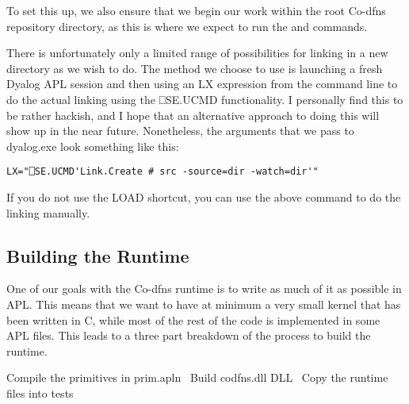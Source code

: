 \documentclass{article}%
\begin{document}
To set this up, we also ensure that we begin our work within the 
root Co-dfns repository directory, as this is where we expect to run 
the {\Tt{}\nwendquote} and {\Tt{}\nwendquote} commands.

There is unfortunately only a limited range of possibilities for 
linking in a new directory as we wish to do. 
The method we choose to use is launching a fresh Dyalog APL session
and then using an {\Tt{}LX\nwendquote} expression from the command line
to do the actual linking using the {\Tt{}⎕SE.UCMD\nwendquote} functionality.
I personally find this to be rather hackish, and I hope that an 
alternative approach to doing this will show up in the near future.
Nonetheless, the arguments that we pass to {\Tt{}dyalog.exe\nwendquote}
look something like this:

\begin{verbatim}
LX="⎕SE.UCMD'Link.Create # src -source=dir -watch=dir'"
\end{verbatim}

If you do not use the {\Tt{}LOAD\nwendquote} shortcut, you can use the above 
command to do the linking manually.

\subsection{Building the Runtime}

One of our goals with the Co-dfns runtime is to write as much of it
as possible in APL.
This means that we want to have at minimum a very small kernel that 
has been written in C,
while most of the rest of the code is implemented in some APL files.
This leads to a three part breakdown of the process to 
build the runtime.

\nwenddocs{}\endmoddef\nwstartdeflinemarkup{}\nwenddeflinemarkup
\LA{}Compile the primitives in \code{}prim.apln\edoc{}~{\nwtagstyle{}}\RA{}
\LA{}Build \code{}codfns.dll\edoc{} DLL~{\nwtagstyle{}}\RA{}
\LA{}Copy the runtime files into \code{}tests{\nwbackslash}\edoc{}~{\nwtagstyle{}}\RA{}
\nwendcode{}\nwdocspar
\end{document}

